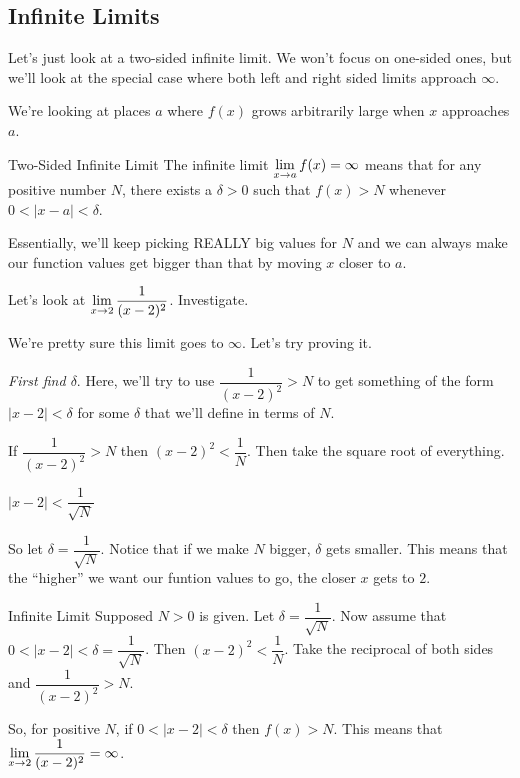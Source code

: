 \subsection*{Infinite Limits}

Let's just look at a two-sided infinite limit. We won't focus on one-sided ones, but we'll look at the special case where both left and right sided limits approach $\infty$.

We're looking at places $a$ where $f(x)$ grows arbitrarily large when $x$ approaches $a$.

\begin{defn}{Two-Sided Infinite Limit}
  The infinite limit $\displaystyle \lim_{x\to a}f(x) = \infty$ means that for any positive number $N$, there exists a $\delta>0$ such that $f(x)>N$ whenever $0<|x-a|<\delta$.
\end{defn}

Essentially, we'll keep picking REALLY big values for $N$ and we can always make our function values get bigger than that by moving $x$ closer to $a$.

Let's look at $\displaystyle \lim_{x\to 2} \dfrac{1}{(x-2)^2}$. Investigate.

We're pretty sure this limit goes to $\infty$. Let's try proving it.

\textit{First find $\delta$}.
Here, we'll try to use $\dfrac{1}{(x-2)^2}>N$ to get something of the form $|x-2|<\delta$ for some $\delta$ that we'll define in terms of $N$.

If $\dfrac{1}{(x-2)^2}>N$ then $(x-2)^2<\dfrac{1}{N}$.
Then take the square root of everything.

$|x-2|<\dfrac{1}{\sqrt{N}}$

So let $\delta=\dfrac{1}{\sqrt{N}}$.
Notice that if we make $N$ bigger, $\delta$ gets smaller.
This means that the ``higher'' we want our funtion values to go, the closer $x$ gets to $2$.

\begin{prf}{Infinite Limit}
  Supposed $N>0$ is given. Let $\delta=\dfrac{1}{\sqrt{N}}$.
  Now assume that $0<|x-2|<\delta=\dfrac{1}{\sqrt{N}}$.
  Then $(x-2)^2<\dfrac{1}{N}$.
  Take the reciprocal of both sides and $\dfrac{1}{(x-2)^2}>N$.

  So, for positive $N$, if $0<|x-2|<\delta$ then $f(x)>N$.
  This means that $\displaystyle \lim_{x\to 2}\dfrac{1}{(x-2)^2}=\infty$.
\end{prf}
